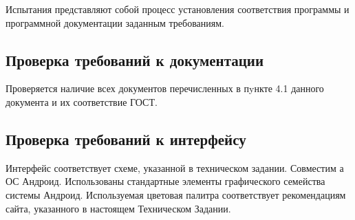 Испытания представляют собой процесс установления соответствия программы и
программной документации заданным требованиям.

\subsection{Проверка требований к документации}
Проверяется наличие всех документов перечисленных в пyнкте 4.1 данного документа и их соответствие ГОСТ.

\subsection{Проверка требований к интерфейсу}
Интерфейс соответствует схеме, указанной в техническом задании. Совместим а ОС
Андроид. Использованы стандартные элементы графического семейства системы
Андроид. Используемая цветовая палитра соответствует рекомендациям сайта,
указанного в настоящем Техническом Задании.

